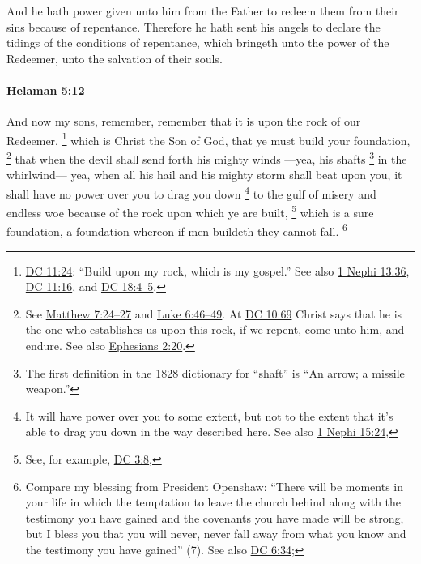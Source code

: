 			And he hath power given unto him from the Father
			to redeem them from their sins because of repentance.
			Therefore he hath sent his angels
			to declare the tidings of the conditions of repentance,
			which bringeth unto the power of the Redeemer,
			unto the salvation of their souls.

		\paragraph{Helaman 5:12} %
			\label{HELAMAN-5-12}
			
			And now my sons, remember, remember
			that it is upon the rock of our Redeemer,%
				\footnote{%
					\hyperref[DC11-24]{DC 11:24}: ``Build upon my rock, which is my gospel.'' See also \hyperref[1NEPHI-13-36]{1 Nephi 13:36}, \hyperref[DC11-16]{DC 11:16}, and \hyperref[DC18-4]{DC 18:4--5}.
					}
			which is Christ the Son of God,
			that ye must build your foundation,%
				\footnote{%
					See \hyperref[MATTHEW-7-24]{Matthew 7:24--27} and \hyperref[LUKE-6-46]{Luke 6:46--49}. At \hyperref[DC10-69]{DC 10:69} Christ says that he is the one who establishes us upon this rock, if we repent, come unto him, and endure. See also \hyperref[EPHESIANS-2-20]{Ephesians 2:20}.
					}
			that when the devil shall send forth his mighty winds
			---yea, his shafts%
				\footnote{%
					The first definition in the 1828 dictionary for ``shaft'' is ``An arrow; a missile weapon.''
					}
			in the whirlwind---
			yea, when all his hail and his mighty storm shall beat upon you,
			it shall have no power over you
			to drag you down%
				\footnote{%
					It will have power over you to some extent, but not to the extent that it's able to drag you down in the way described here. See also \hyperref[1NEPHI-15-24]{1 Nephi 15:24}, 
					}
			to the gulf of misery and endless woe
			because of the rock upon which ye are built,%
				\footnote{%
					See, for example, \hyperref[DC3-8]{DC 3:8}, 
					}
			which is a sure foundation,
			a foundation whereon if men buildeth they cannot fall.%
				\footnote{%
					Compare my blessing from President Openshaw: ``There will be moments in your life in which the temptation to leave the church behind along with the testimony you have gained and the covenants you have made will be strong, but I bless you that you will never, never fall away from what you know and the testimony you have gained'' (7). See also \hyperref[DC6-34]{DC 6:34}; 
					}

